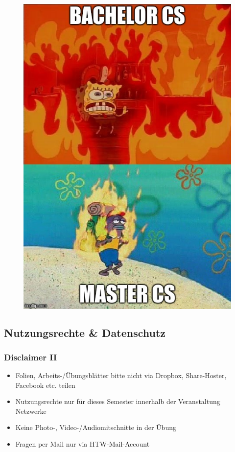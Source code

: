 \documentclass[xcolor=dvipsnames,aspectratio=169]{beamer}
\begin{document}
\begin{frame}\frametitle{}
\begin{figure}[]
\centering
\includegraphics[scale=0.27]{sponge}
\end{figure}
\end{frame}

\subsection{Nutzungsrechte \& Datenschutz}
\begin{frame}
	\frametitle{Disclaimer II}
	\begin{itemize}
		\item Folien, Arbeits-/Übungsblätter bitte nicht via Dropbox, Share-Hoster, Facebook etc. teilen
		\item Nutzungsrechte nur für dieses Semester innerhalb der Veranstaltung Netzwerke
		\item Keine Photo-, Video-/Audiomitschnitte in der Übung
		\item Fragen per Mail nur via HTW-Mail-Account
	\end{itemize}
\end{frame}
\end{document}
